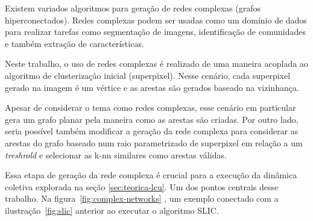 Existem variados algoritmos para geração de redes complexas (grafos
hiperconectados). Redes complexas podem ser usadas como um domínio de
dados para realizar tarefas como segmentação de imagens, identificação
de comunidades e também extração de características.

Neste trabalho, o uso de redes complexas é realizado de uma maneira
acoplada ao algoritmo de clusterização inicial (superpixel). Nesse
cenário, cada superpixel gerado na imagem é um vértice e as arestas
são gerados baseado na vizinhança.

Apesar de considerar o tema como redes complexas, esse cenário em
particular gera um grafo planar pela maneira como as arestas são
criadas. Por outro lado, seria possível também modificar a geração da
rede complexa para considerar as arestas do grafo baseado num raio
parametrizado de superpixel em relação a um \textit{treshrold} e
selecionar as k-nn similares como arestas válidas.

Essa etapa de geração da rede complexa é crucial para a execução da
dinâmica coletiva explorada na seção \ref{sec:teorica-lcu}. Um dos pontos
centrais desse trabalho. Na figura~\ref{fig:complex-networks}
, um exemplo conectado com a ilustração~\ref{fig:slic}
anterior ao executar o algoritmo SLIC.

\begin{figure}[t]
        \captionsetup{width=12cm}
		\centering
\end{figure}
\FloatBarrier

